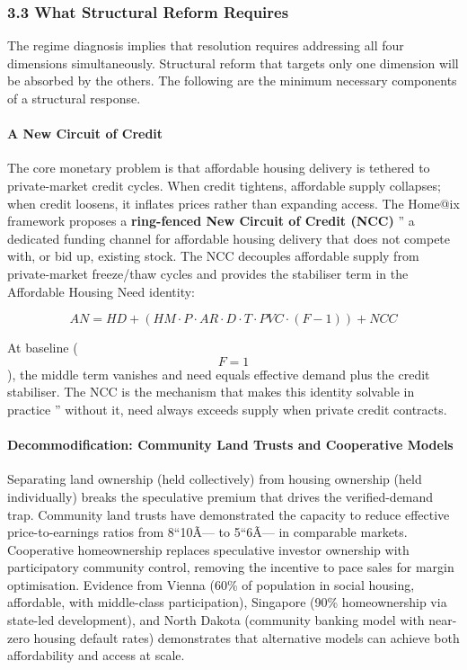 \documentclass[
]{article}
\begin{document}
\subsubsection{3.3 What Structural Reform
Requires}\label{what-structural-reform-requires}

The regime diagnosis implies that resolution requires addressing all
four dimensions simultaneously. Structural reform that targets only one
dimension will be absorbed by the others. The following are the minimum
necessary components of a structural response.

\paragraph{A New Circuit of Credit}\label{a-new-circuit-of-credit}

The core monetary problem is that affordable housing delivery is
tethered to private-market credit cycles. When credit tightens,
affordable supply collapses; when credit loosens, it inflates prices
rather than expanding access. The Home@ix framework proposes a
\textbf{ring-fenced New Circuit of Credit (NCC)} '' a dedicated funding
channel for affordable housing delivery that does not compete with, or
bid up, existing stock. The NCC decouples affordable supply from
private-market freeze/thaw cycles and provides the stabiliser term in
the Affordable Housing Need identity:

\[AN = HD + (HM \cdot P \cdot AR \cdot D \cdot T \cdot PVC \cdot (F - 1)) + NCC\]

At baseline (\[F = 1\]), the middle term vanishes and need equals
effective demand plus the credit stabiliser. The NCC is the mechanism
that makes this identity solvable in practice '' without it, need always
exceeds supply when private credit contracts.

\paragraph{Decommodification: Community Land Trusts and Cooperative
Models}\label{decommodification-community-land-trusts-and-cooperative-models}

Separating land ownership (held collectively) from housing ownership
(held individually) breaks the speculative premium that drives the
verified-demand trap. Community land trusts have demonstrated the
capacity to reduce effective price-to-earnings ratios from 8``10Ã--- to
5``6Ã--- in comparable markets. Cooperative homeownership replaces
speculative investor ownership with participatory community control,
removing the incentive to pace sales for margin optimisation. Evidence
from Vienna (60\% of population in social housing, affordable, with
middle-class participation), Singapore (90\% homeownership via state-led
development), and North Dakota (community banking model with near-zero
housing default rates) demonstrates that alternative models can achieve
both affordability and access at scale.
\end{document}
